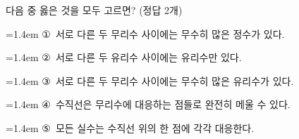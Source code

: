 다음 중 옳은 것을 모두 고르면? (정답 2개)
\par\medskip\par\noindent\hangindent=1.4em {\small ①}\ 서로 다른 두 무리수 사이에는 무수히 많은 정수가 있다.\par\noindent\hangindent=1.4em {\small ②}\ 서로 다른 두 유리수 사이에는 유리수만 있다.\par\noindent\hangindent=1.4em {\small ③}\ 서로 다른 두 무리수 사이에는 무수히 많은 유리수가 있다.\par\noindent\hangindent=1.4em {\small ④}\ 수직선은 무리수에 대응하는 점들로 완전히 메울 수 있다.\par\noindent\hangindent=1.4em {\small ⑤}\ 모든 실수는 수직선 위의 한 점에 각각 대응한다.\par\medskip
